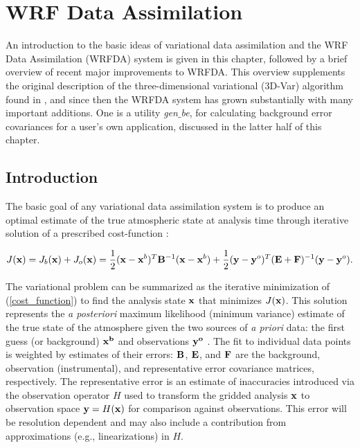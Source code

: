 \chapter{WRF Data Assimilation}
\label{var_chap}

An introduction to the basic ideas of variational data assimilation and
the WRF Data Assimilation (WRFDA) system \citep{barker12} is given in this chapter, followed by a brief
overview of recent major improvements to WRFDA.  This overview
supplements the original description of the three-dimensional
variational (3D-Var) algorithm found in \citet{barker04},
and since then the WRFDA system has grown substantially with 
many important additions.  One is a utility {\it gen$\_$be},
for calculating background error covariances for a user's own
application, discussed in the latter half of this chapter.

\section{Introduction}
\label{var-intro}

The basic goal of any variational data assimilation system is to produce
an optimal estimate of the true atmospheric state at analysis time
through iterative solution of a prescribed cost-function \citep{ide97}:

\begin{equation}
J({\bf x}) = J_b({\bf x}) + J_o({\bf x}) = \frac{1}{2 
} ({\bf x}-{\bf x}^{b})^{T}{\bf B}^{-1}({\bf x}-{\bf x}^{b}) + 
\frac{1}{2}
({\bf y}-{\bf y}^{o})^{T}({\bf E+F})^{-1}({\bf y}-{\bf y}^{o}).
\label{cost_function}
\end{equation}

The variational problem can be summarized as the iterative minimization
of (\ref{cost_function}) to find the analysis state ${\bf x}$ that
minimizes $J({\bf x})$. This solution represents the {\it a posteriori}
maximum likelihood (minimum variance) estimate of the true state of the
atmosphere given the two sources of {\it a priori} data: the first guess
(or background) ${\bf x^{b}}$ and observations ${\bf y^{o}}$
\citep{lorenc86}. The fit to individual data points is weighted by
estimates of their errors: ${\bf B}$, ${\bf E}$, and ${\bf F}$ are the
background, observation (instrumental), and representative error
covariance matrices, respectively. The representative error is an estimate of
inaccuracies introduced via the observation operator $H$ used to
transform the gridded analysis ${\bf x}$ to observation space ${\bf
y}=H({\bf x})$ for comparison against observations. This error will be
resolution dependent and may also include a contribution from
approximations (e.g., linearizations) in $H$.

